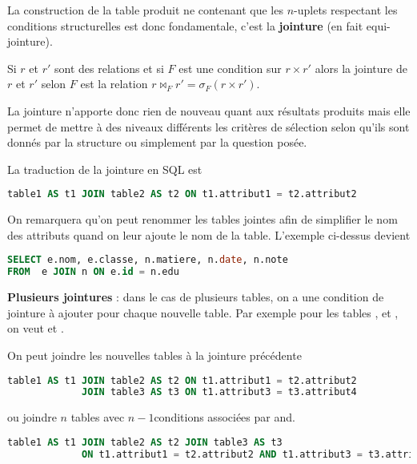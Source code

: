 La construction de la table produit ne contenant que les $n$-uplets respectant les conditions structurelles est donc fondamentale, c'est la {\bf jointure} (en fait equi-jointure).

\begin{defin}[Jointure]

Si $r$ et $r'$ sont des relations et si $F$ est une condition sur $r\times r'$ 
alors la jointure de $r$ et $r'$ selon $F$ est la relation $r\bowtie_F r'=\sigma_F(r\times r')$.
\end{defin}

La jointure n'apporte donc rien de nouveau quant aux résultats produits mais elle permet de mettre à des niveaux différents les critères de sélection selon qu'ils sont donnés par la structure ou simplement par la question posée.

La traduction de la jointure en SQL est
\begin{lstlisting}[language=SQL]
table1 AS t1 JOIN table2 AS t2 ON t1.attribut1 = t2.attribut2
\end{lstlisting}

On remarquera qu'on peut renommer les tables jointes afin de simplifier le nom des attributs quand on leur ajoute le nom de la table. L'exemple ci-dessus devient 
\begin{lstlisting}[language=SQL]
SELECT e.nom, e.classe, n.matiere, n.date, n.note
FROM  e JOIN n ON e.id = n.edu
\end{lstlisting}
{\bf Plusieurs jointures} : dans le cas de plusieurs tables, on a une condition de jointure à ajouter pour chaque nouvelle table. Par exemple pour les tables , et , on veut
 et  .

On peut joindre les nouvelles tables à la jointure précédente
\begin{lstlisting}[language=SQL]
table1 AS t1 JOIN table2 AS t2 ON t1.attribut1 = t2.attribut2
             JOIN table3 AS t3 ON t1.attribut3 = t3.attribut4
\end{lstlisting}
ou joindre $n$ tables avec $n-1$conditions associées par {\sc and}.
\begin{lstlisting}[language=SQL]
table1 AS t1 JOIN table2 AS t2 JOIN table3 AS t3 
             ON t1.attribut1 = t2.attribut2 AND t1.attribut3 = t3.attribut4
\end{lstlisting}
\newpage
